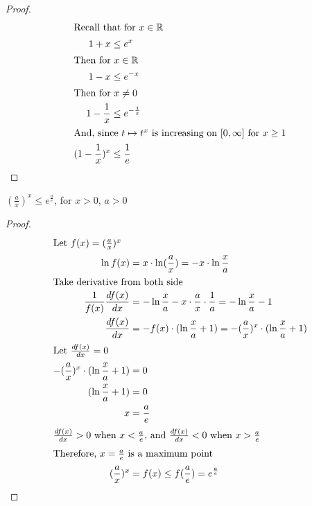 \begin{proof}

\begin{align}
\shortintertext{Recall that for $x \in \mathbb{R}$}
    1 + x &\le e^x \nonumber \\
\shortintertext{Then for $x \in \mathbb{R}$}
    1 - x &\le e^{-x} \nonumber \\
\shortintertext{Then for $x \neq 0$}
    1 - \frac{1}{x} &\le e^{-\frac{1}{x}} \nonumber \\ 
\shortintertext{And, since $t \mapsto t^x$ is increasing on $[0, \infty]$ for $x \ge 1$}
   (1 - \frac{1}{x})^x &\le \frac{1}{e}
\end{align}

\end{proof}

\begin{lemma}
\label{lemma:(1x)x}

$(\frac{a}{x})^x \le e^\frac{a}{e}$, for $x > 0$, $a > 0$

\end{lemma}

\begin{proof}

\begin{align}
\shortintertext{Let $f(x) = (\frac{a}{x})^x $}
    \ln f(x) &= x \cdot \ln (\frac{a}{x}) \nonumber = - x \cdot \ln \frac{x}{a} \\
\shortintertext{Take derivative from both side}
    \frac{1}{f(x)} \frac{df(x)}{dx} &= -\ln \frac{x}{a} - x \cdot \frac{a}{x} \cdot \frac{1}{a} = -\ln \frac{x}{a} - 1 \nonumber \\
    \frac{df(x)}{dx} &= - f(x) \cdot (\ln \frac{x}{a} + 1) \nonumber = - (\frac{a}{x})^x \cdot (\ln \frac{x}{a} + 1) \\
\shortintertext{Let $\frac{df(x)}{dx} = 0$}
    - (\frac{a}{x})^x \cdot (\ln \frac{x}{a} + 1) &= 0 \nonumber \\
    (\ln \frac{x}{a} + 1) &= 0 \nonumber \\
    x &= \frac{a}{e} \nonumber \\
\shortintertext{$\frac{df(x)}{dx} > 0$ when $x < \frac{a}{e}$, and $\frac{df(x)}{dx} < 0$ when $x > \frac{a}{e}$}
\shortintertext{Therefore, $x = \frac{a}{e}$ is a maximum point}
    (\frac{a}{x})^x &= f(x) \le f(\frac{a}{e}) = {e}^\frac{a}{e}
\end{align}

\end{proof}


